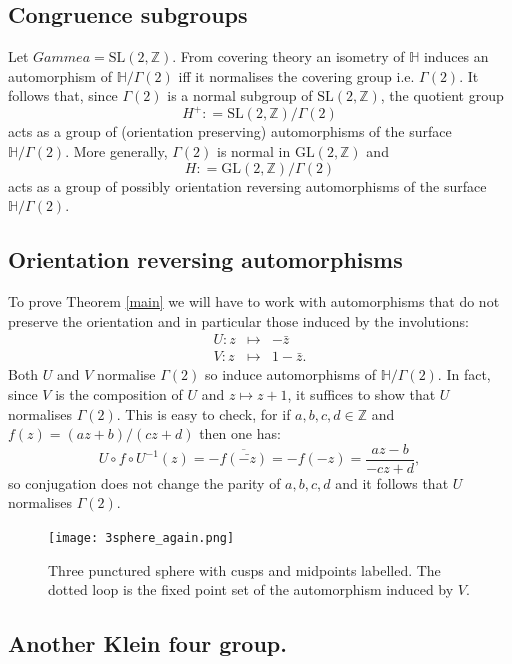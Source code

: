 \documentclass[12pt,a4paper]{amsart}
\def\HH{\mathbb{H}}
\def\xx{\HH/g2}
\def\ZZ{\mathbb{Z}}
\def\gl2{\mathrm{GL}(2, \ZZ)}
\def\sl2{\mathrm{SL}(2, \ZZ)}
\def\g2{\Gamma(2)}
\def\xx{\HH/\g2}
\begin{document}
\subsection{Congruence  subgroups}

Let $Gammea =  \sl2$.
From covering theory an isometry  of $\HH$ 
induces an automorphism of $\xx$ iff it normalises the covering group
i.e. $\g2$.
It follows that,
since $\g2$ is a normal subgroup of $\sl2$,
 the quotient group
$$H^+: = \sl2/\g2$$
acts as a group of (orientation preserving) automorphisms of the surface $\xx$.
More generally, $\g2$ is normal in $\gl2$ and 
$$H: = \gl2/\g2$$
acts as a group of possibly orientation reversing  automorphisms of the surface $\xx$.


\subsection{Orientation reversing automorphisms}
To prove Theorem \ref{main} we will have to work with automorphisms
that do not preserve the orientation and in particular 
those induced by the involutions:
\begin{eqnarray*}
U: z &\mapsto& -\bar{z} \\
V: z &\mapsto& 1 -\bar{z}.
\end{eqnarray*}
Both $U$ and $V$ normalise $\g2$ so induce automorphisms of $\xx$.
In fact, since $V$ is the composition of $U$ and $z \mapsto z + 1$,
it suffices to show that $U$ normalises $\g2$.
This is easy to check, for if  $a,b,c,d \in \ZZ$ 
and  $f(z) = (az + b)/ (cz +d )$  then one has:
$$ U\circ f \circ U^{-1} (z) =  -\overline{f(\bar{-z})} = -f(-z) =   \frac{az - b}{-cz +d }, $$
  so conjugation does not change the parity of $a,b,c,d$ 
  and it follows that  $U$ normalises $\g2$.


 \begin{figure}[hb]
\begin{center}
\texttt{[image: 3sphere\_again.png]} 
\end{center}
\caption{Three punctured sphere with cusps and midpoints labelled.
The dotted loop is the fixed point set of the automorphism induced by $V$.}
 \label{3punctured}
\end{figure}



\subsection{Another Klein four group.}
\end{document}
